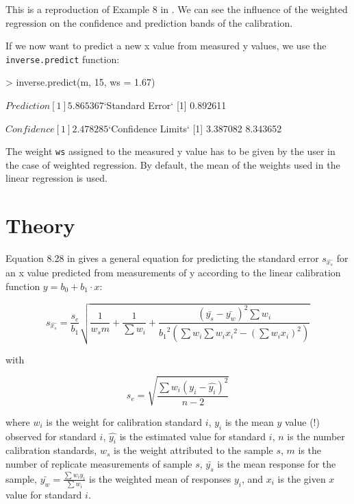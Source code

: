 \documentclass[a4paper]{article}
\begin{document}
This is a reproduction of Example 8 in \cite{massart97}. We can
see the influence of the weighted regression on the confidence
and prediction bands of the calibration.

If we now want to predict a new x value from measured y values,
we use the \texttt{inverse.predict} function:

\begin{Schunk}
\begin{Sinput}
> inverse.predict(m, 15, ws = 1.67)
\end{Sinput}
\begin{Soutput}
$Prediction
[1] 5.865367

$`Standard Error`
[1] 0.892611

$Confidence
[1] 2.478285

$`Confidence Limits`
[1] 3.387082 8.343652
\end{Soutput}
\end{Schunk}

The weight \texttt{ws} assigned to the measured y value has to be 
given by the user in the case of weighted regression. By default, 
the mean of the weights used in the linear regression is used.

\section*{Theory}
Equation 8.28 in \cite{massart97} gives a general equation for predicting the
standard error $s_{\hat{x_s}}$ for an x value predicted from measurements of y
according to the linear calibration function $ y = b_0 + b_1 \cdot x$:

\begin{equation}
s_{\hat{x_s}} = \frac{s_e}{b_1} \sqrt{\frac{1}{w_s m} + \frac{1}{\sum{w_i}} +
    \frac{(\bar{y_s} - \bar{y_w})^2 \sum{w_i}}
        {{b_1}^2 \left( \sum{w_i} \sum{w_i {x_i}^2} - {\left( \sum{ w_i x_i } \right)}^2 \right) }}
\end{equation}

with

\begin{equation}
s_e = \sqrt{ \frac{\sum w_i (y_i - \hat{y_i})^2}{n - 2}}
\end{equation}

where $w_i$ is the weight for calibration standard $i$, $y_i$ is the mean $y$
value (!) observed for standard $i$, $\hat{y_i}$ is the estimated value for
standard $i$, $n$ is the number calibration standards, $w_s$ is the weight
attributed to the sample $s$, $m$ is the number of replicate measurements of
sample $s$, $\bar{y_s}$ is the mean response for the sample, 
$\bar{y_w} = \frac{\sum{w_i y_i}}{\sum{w_i}}$ is the weighted mean of responses
$y_i$, and $x_i$ is the given $x$ value for standard $i$.
\end{document}
